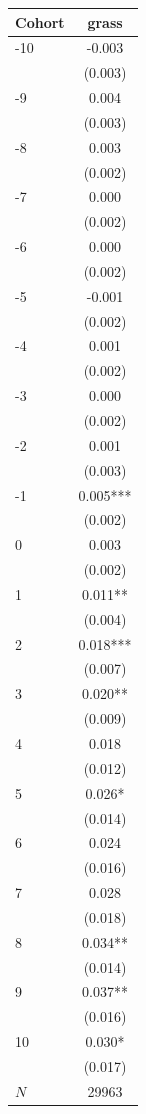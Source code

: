 {
\def\sym#1{\ifmmode^{#1}\else\(^{#1}\)\fi}
\begin{tabular}{l*{1}{c}}
\toprule
Cohort    &    grass   \\
\midrule
-10       &   -0.003   \\
          &  (0.003)   \\
-9        &    0.004   \\
          &  (0.003)   \\
-8        &    0.003   \\
          &  (0.002)   \\
-7        &    0.000   \\
          &  (0.002)   \\
-6        &    0.000   \\
          &  (0.002)   \\
-5        &   -0.001   \\
          &  (0.002)   \\
-4        &    0.001   \\
          &  (0.002)   \\
-3        &    0.000   \\
          &  (0.002)   \\
-2        &    0.001   \\
          &  (0.003)   \\
-1        &    0.005***\\
          &  (0.002)   \\
0         &    0.003   \\
          &  (0.002)   \\
1         &    0.011** \\
          &  (0.004)   \\
2         &    0.018***\\
          &  (0.007)   \\
3         &    0.020** \\
          &  (0.009)   \\
4         &    0.018   \\
          &  (0.012)   \\
5         &    0.026*  \\
          &  (0.014)   \\
6         &    0.024   \\
          &  (0.016)   \\
7         &    0.028   \\
          &  (0.018)   \\
8         &    0.034** \\
          &  (0.014)   \\
9         &    0.037** \\
          &  (0.016)   \\
10        &    0.030*  \\
          &  (0.017)   \\
\midrule
\(N\)     &    29963   \\
\bottomrule
\end{tabular}
}
